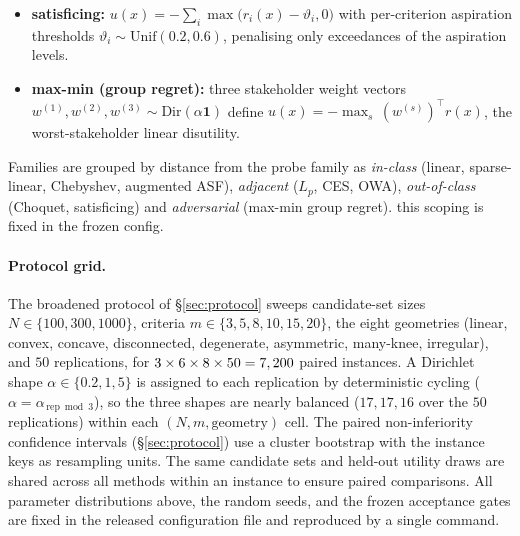 \begin{itemize}
integral. we deliberately avoid claiming it is exactly the standard $2$-additive
Choquet integral (whose Möbius/capacity form involves $\min$ terms for the
pairwise interactions), and use it only as a genuinely non-additive held-out
family.
\item \textbf{satisficing:} $u(x)=-\sum_i \max\bigl(r_i(x)-\vartheta_i,0\bigr)$ with
per-criterion aspiration thresholds $\vartheta_i\sim\mathrm{Unif}(0.2,0.6)$,
penalising only exceedances of the aspiration levels.
\item \textbf{max-min (group regret):} three stakeholder weight vectors
$w^{(1)},w^{(2)},w^{(3)}\sim\mathrm{Dir}(\alpha\mathbf 1)$ define
$u(x)=-\max_{s}\, (w^{(s)})^\top r(x)$, the worst-stakeholder linear disutility.
\end{itemize}
Families are grouped by distance from the probe family as \emph{in-class}
(linear, sparse-linear, Chebyshev, augmented ASF), \emph{adjacent}
($L_p$, CES, OWA), \emph{out-of-class} (Choquet, satisficing) and
\emph{adversarial} (max-min group regret). this scoping is fixed in the frozen
config.

\paragraph{Protocol grid.}
The broadened protocol of \S\ref{sec:protocol} sweeps candidate-set sizes
$N\in\{100,300,1000\}$, criteria $m\in\{3,5,8,10,15,20\}$, the eight geometries
(linear, convex, concave, disconnected, degenerate, asymmetric, many-knee,
irregular), and $50$ replications, for $3\times6\times8\times50=7,200{}$
paired instances. A Dirichlet shape $\alpha\in\{0.2,1,5\}$ is assigned to each
replication by deterministic cycling ($\alpha=\alpha_{\,\mathrm{rep}\bmod 3}$), so
the three shapes are nearly balanced ($17,17,16$ over the $50$ replications) within each $(N,m,\text{geometry})$ cell. The paired
non-inferiority confidence intervals (\S\ref{sec:protocol}) use a cluster
bootstrap with the instance keys as resampling units. The same candidate sets and held-out utility draws are shared across
all methods within an instance to ensure paired comparisons. All parameter
distributions above, the random seeds, and the frozen acceptance gates are fixed
in the released configuration file and reproduced by a single command.

